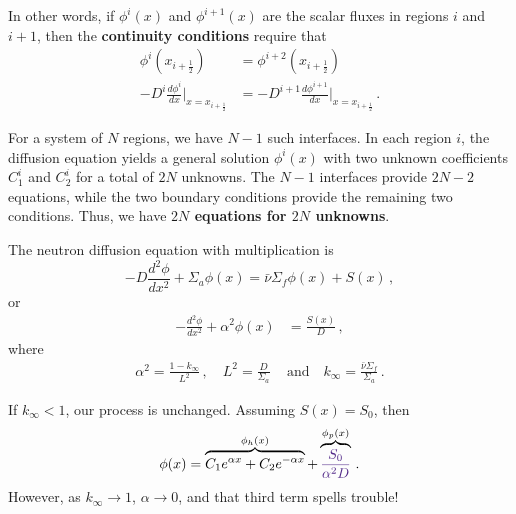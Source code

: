 \documentclass[compact]{ne630handout}
\begin{document}
\begin{handoutflow}
In other words, if $\phi^{i}(x)$ and $\phi^{i+1}(x)$ are the scalar fluxes in
regions $i$ and $i+1$, then the {\bf continuity conditions} require that
\begin{align*}
\tag{flux continuity}
 \phi^{i}(x_{i+\frac{1}{2}}) &= \phi^{i+2}(x_{i+\frac{1}{2}})  \\
\tag{current continuity}
 -D^{i} \frac{d\phi^{i}}{dx}\Big |_{x=x_{i+\frac{1}{2}}} &= -D^{i+1} \frac{d\phi^{i+1}}{dx}\Big |_{x=x_{i+\frac{1}{2}}}  \, .
\end{align*}

For a system of $N$ regions, we have $N-1$ such interfaces.  In each region $i$, the
diffusion equation yields a general solution $\phi^{i}(x)$ with two unknown
coefficients $C^i_1$ and $C^i_2$ for a total of $2N$ unknowns.  The $N-1$ interfaces
provide $2N-2$ equations, while the two boundary conditions provide the remaining
two conditions. Thus, we have {\bf $2N$ equations for $2N$ unknowns}.

The neutron diffusion equation with multiplication is
\begin{equation*}
  -D \frac{d^2 \phi}{dx^2} + \Sigma_a \phi(x) = \bar{\nu}\Sigma_f \phi(x) + S(x) \, ,
\end{equation*}
or
\begin{align*}
 - \frac{d^2 \phi}{dx^2} + \alpha^2 \phi(x) &=  \frac{S(x)}{D} \, ,
\end{align*}
where
\begin{align*}
\alpha^2 = \frac{1-k_{\infty}}{L^2} \, , \quad L^2 = \frac{D}{\Sigma_a} \,
   \quad \text{and} \quad k_{\infty} = \frac{\bar{\nu}\Sigma_f}{\Sigma_a} \, .
\end{align*}

If $k_{\infty} < 1$, our process is unchanged. Assuming $S(x) = S_0$, then
\begin{equation*}
  \phi(x) = \overbrace{C_1 e^{\alpha x} + C_2 e^{-\alpha x}}^{\phi_h(x)} +
     \overbrace{\textcolor{wcprimary}{\frac{S_0}{\alpha^2 D}}}^{\phi_p(x)} \, .
\end{equation*}
However, as $k_{\infty} \to 1$,  $\alpha \to 0$, and  that \textcolor{wcprimary}{third term} spells trouble!


\end{handoutflow}
\end{document}
